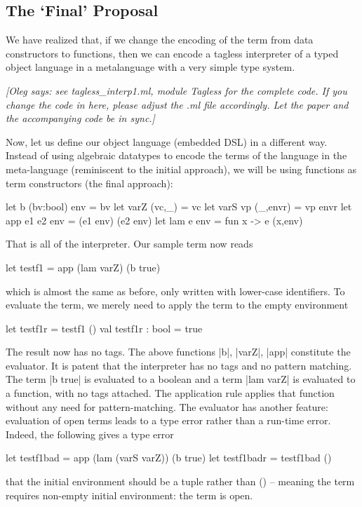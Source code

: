 \documentclass[preprint]{sigplanconf}
\newcommand{\oleg}[1]{{\it [Oleg says: #1]}}
\begin{document}
\subsection{The `Final' Proposal}
We have realized that, if we change the encoding of the term from data
constructors to functions, then we can encode a tagless interpreter of a
typed object language in a metalanguage with a very simple type system.

\oleg{see tagless\_interp1.ml, module Tagless for the complete code.
If you change the code in here, please adjust the .ml file
accordingly. Let the paper and the accompanying code be in sync.}

Now, let us define our object language (embedded DSL) in a different
way. Instead of using algebraic datatypes to encode the terms of the
language in the meta-language (reminiscent to the initial approach),
we will be using functions as term constructors (the final approach):

\begin{code}
  let b (bv:bool) env = bv
  let varZ (vc,_) = vc
  let varS vp (_,envr) = vp envr
  let app e1 e2 env = (e1 env) (e2 env)
  let lam e env = fun x -> e (x,env)
\end{code}

That is all of the interpreter. Our sample term now reads
\begin{code}
  let testf1 = app (lam varZ) (b true)
\end{code}
which is almost the same as before, only written with lower-case
identifiers. To evaluate the term, we merely need to apply 
the term to the empty environment

\begin{code}
  let testf1r = testf1 ()
  val testf1r : bool = true
\end{code}

The result now has no tags. The above functions |b|,
|varZ|, |app| constitute the evaluator. It is patent that the
interpreter has no tags and no pattern matching. The term |b true| is
evaluated to a boolean and a term |lam varZ| is evaluated to a
function, with no tags attached. The application rule applies that
function without any need for pattern-matching. The evaluator has
another feature: evaluation of open terms leads to a type error rather
than a run-time error. Indeed, the following gives a type error

\begin{code}
  let testf1bad = app (lam (varS varZ)) (b true)
  let testf1badr = testf1bad ()
\end{code}
that the initial environment should be a tuple rather than () --
meaning the term requires non-empty initial environment: the term is
open.
\end{document}
